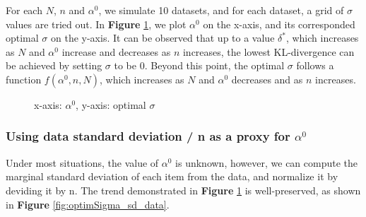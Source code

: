 \documentclass[11pt, oneside]{article}   	%
\begin{document}
For each $N$, $n$ and $\alpha^0$, we simulate 10 datasets, and for each dataset, a grid of $\sigma$ values are tried out. In \textbf{Figure }\ref{fig:optimSigma}, we plot $\alpha^0$ on the x-axis, and its corresponded optimal $\sigma$ on the y-axis. It can be observed that up to a value $\delta ^*$, which increases as $N$ and $\alpha^0$ increase and decreases as $n$ increases, the lowest KL-divergence can be achieved by setting $\sigma$ to be 0. Beyond this point, the optimal $\sigma$ follows a function $f(\alpha^0, n,N)$, which increases as $N$ and $\alpha^0$ decreases and as $n$ increases.
\begin{figure}[h!]
		\caption{x-axis: $\alpha^0$, y-axis: optimal $\sigma$}
		\label{fig:optimSigma}
\end{figure}

\subsubsection{Using data standard deviation / n as a proxy for $\alpha^0$}
Under most situations, the value of $\alpha^0$ is unknown, however, we can compute the marginal standard deviation of each item from the data, and normalize it by deviding it by n. The trend demonstrated in \textbf{Figure }\ref{fig:optimSigma} is well-preserved, as shown in \textbf{Figure }\ref{fig:optimSigma_sd_data}.
\end{document}
